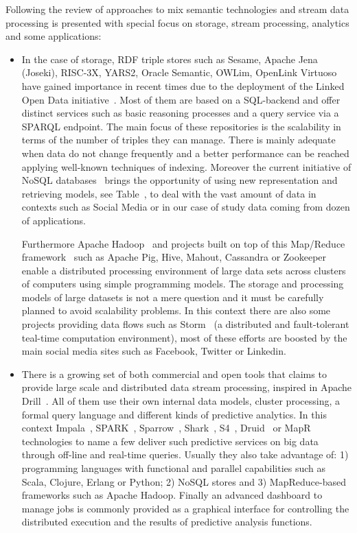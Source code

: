 Following the review of approaches to mix semantic technologies and stream data processing is 
presented with special focus on storage, stream processing, analytics and some applications:
\begin{itemize}
 \item In the case of storage, RDF triple stores such as Sesame, Apache Jena 
(Joseki), RISC-3X, YARS2, Oracle Semantic, OWLim, OpenLink Virtuoso have gained 
importance in recent times due to the deployment of the Linked Open Data 
initiative~\cite{Auer:2007:DNW:1785162.1785216}. Most of them are based on a SQL-backend and offer distinct 
services such as basic reasoning processes and a query service via a SPARQL 
endpoint. The main focus of these repositories is the scalability in terms of 
the number of triples they can manage. There is mainly adequate when data do not 
change frequently and a better performance can be reached applying well-known 
techniques of indexing. Moreover the current initiative of NoSQL databases~\cite{NoSQLdistilled} 
brings the opportunity of using new representation and retrieving models, see 
Table~\cite{nosql-db},  to deal with the vast amount of data in contexts such as Social Media 
or in our case of study data coming from dozen of applications.

Furthermore Apache Hadoop~\cite{perera2013mapreduce,owens2013mapreduce} and projects built on top of this Map/Reduce 
framework~\cite{Dean:2008:MSD:1327452.1327492} such as Apache Pig, Hive, Mahout, Cassandra or Zookeeper enable a 
distributed processing environment of large data sets across clusters of 
computers using simple programming models. The storage and processing models of 
large datasets is not a mere question and it must be carefully planned to avoid 
scalability problems. In this context there are also some projects providing 
data flows such as Storm~\cite{BigDataManing} (a distributed and fault-tolerant teal-time 
computation environment), most of these efforts are boosted by the main social 
media sites such as Facebook, Twitter or Linkedin. 

\item There is a growing set of both commercial and open tools that 
claims to provide large scale and distributed data stream processing, inspired in Apache Drill~\cite{hausenblas2013apache}. 
All of them use their own internal data models, cluster processing, a formal query language and different kinds of 
predictive analytics. In this context Impala~\cite{impala-project}, SPARK~\cite{zaharia2012discretized}, Sparrow~\cite{ousterhout2013sparrow},
Shark~\cite{DBLP:conf/sigmod/XinRZFSS13}, S4~\cite{neumeyer2010s4}, Druid~\cite{yangdruid} or MapR~\cite{mapr-project} technologies to name a 
few deliver such predictive services on big data through off-line and real-time queries. Usually they 
also take advantage of: 1) programming languages with functional and parallel capabilities such as Scala, Clojure, Erlang or Python; 
2) NoSQL stores and 3) MapReduce-based frameworks such as Apache Hadoop. Finally an advanced dashboard to manage jobs is 
commonly provided as a graphical interface for controlling the distributed execution and the results of predictive 
analysis functions.



\end{itemize}
